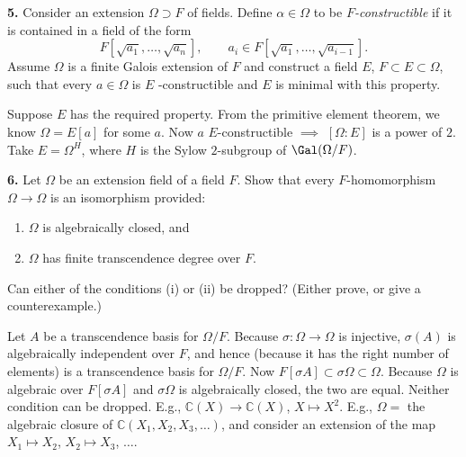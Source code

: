 \documentclass[a4paper,11pt,final,openany]{memoir}
\theoremstyle{nonumberplain}
\begin{document}
\medskip\noindent\textbf{5.} Consider an extension $\Omega\supset F$ of
fields. Define $\alpha\in\Omega$ to be $F$\textit{-constructible\/} if it is
contained in a field of the form
\[
F[\sqrt{a_{1}},\ldots,\sqrt{a_{n}}],\qquad a_{i}\in F[\sqrt{a_{1}}%
,\ldots,\sqrt{a_{i-1}}].
\]
Assume $\Omega$ is a finite Galois extension of $F$ and construct a field $E
$, $F\subset E\subset\Omega$, such that every $a\in\Omega$ is $E$%
-constructible and $E$ is minimal with this property.

Suppose $E$ has the required property. From the primitive element theorem, we
know $\Omega=E[a]$ for some $a$. Now $a$ $E$-constructible $\implies$
$[\Omega\colon E]$ is a power of $2$. Take $E=\Omega^{H}$, where $H$ is the
Sylow $2$-subgroup of $\Gal(\Omega/F)$.

\medskip\noindent\textbf{6.} Let $\Omega$ be an extension field of a field $F
$. Show that every $F$-homomorphism $\Omega\to\Omega$ is an isomorphism provided:

\begin{enumerate}
\item $\Omega$ is algebraically closed, and

\item $\Omega$ has finite transcendence degree over $F$.
\end{enumerate}

Can either of the conditions (i) or (ii) be dropped? (Either prove, or give a counterexample.)

Let $A$ be a transcendence basis for $\Omega/F$. Because $\sigma\colon
\Omega\rightarrow\Omega$ is injective, $\sigma(A)$ is algebraically
independent over $F$, and hence (because it has the right number of elements)
is a transcendence basis for $\Omega/F$. Now $F[\sigma A]\subset\sigma
\Omega\subset\Omega$. Because $\Omega$ is algebraic over $F[\sigma A]$ and
$\sigma\Omega$ is algebraically closed, the two are equal. Neither condition
can be dropped. E.g., $\mathbb{C}(X)\mathbb{\rightarrow C}(X)$, $X\mapsto
X^{2}$. E.g., $\Omega=$ the algebraic closure of $\mathbb{C}(X_{1},X_{2}%
,X_{3},\ldots)$, and consider an extension of the map $X_{1}\mapsto X_{2}$,
$X_{2}\mapsto X_{3}$, $\ldots$.\clearpage%

\footnotesize


\printindex
\end{document}
